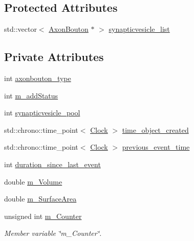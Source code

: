 \subsection*{Protected Attributes}
\begin{DoxyCompactItemize}
\item 
std\+::vector$<$ \mbox{\hyperlink{classAxonBouton}{Axon\+Bouton}} $\ast$ $>$ \mbox{\hyperlink{classAxonBouton_ad5b4e9b5fefb2ad9e6dfe5ad91be2dd7}{synapticvesicle\+\_\+list}}
\end{DoxyCompactItemize}
\subsection*{Private Attributes}
\begin{DoxyCompactItemize}
\item 
int \mbox{\hyperlink{classAxonBouton_a29ded5dabe0b9a52fc3f1612aec68cf3}{axonbouton\+\_\+type}}
\item 
int \mbox{\hyperlink{classAxonBouton_a485081d54e0afcbe697877524cebe30d}{m\+\_\+add\+Status}}
\item 
int \mbox{\hyperlink{classAxonBouton_a6af09fee2eb7a38e8591770bc9c070ac}{synapticvesicle\+\_\+pool}}
\item 
std\+::chrono\+::time\+\_\+point$<$ \mbox{\hyperlink{universe_8h_a0ef8d951d1ca5ab3cfaf7ab4c7a6fd80}{Clock}} $>$ \mbox{\hyperlink{classAxonBouton_a26b17307437394ff14bfb5ef8dfad1e5}{time\+\_\+object\+\_\+created}}
\item 
std\+::chrono\+::time\+\_\+point$<$ \mbox{\hyperlink{universe_8h_a0ef8d951d1ca5ab3cfaf7ab4c7a6fd80}{Clock}} $>$ \mbox{\hyperlink{classAxonBouton_a6382c6be1211fdde45dd497ae56d8bbb}{previous\+\_\+event\+\_\+time}}
\item 
int \mbox{\hyperlink{classAxonBouton_a04b61a53dc110ceb77484cf894ff3787}{duration\+\_\+since\+\_\+last\+\_\+event}}
\item 
double \mbox{\hyperlink{classAxonBouton_ae994ae9fbfc40188b2379b61758d18c1}{m\+\_\+\+Volume}}
\item 
double \mbox{\hyperlink{classAxonBouton_a6a17c18e315806baa28a907e6799c6dd}{m\+\_\+\+Surface\+Area}}
\item 
unsigned int \mbox{\hyperlink{classAxonBouton_a043ef274a67fc10c6288044907533b27}{m\+\_\+\+Counter}}
\begin{DoxyCompactList}\small\item\em Member variable \char`\"{}m\+\_\+\+Counter\char`\"{}. \end{DoxyCompactList}\item 

\end{DoxyCompactItemize}
